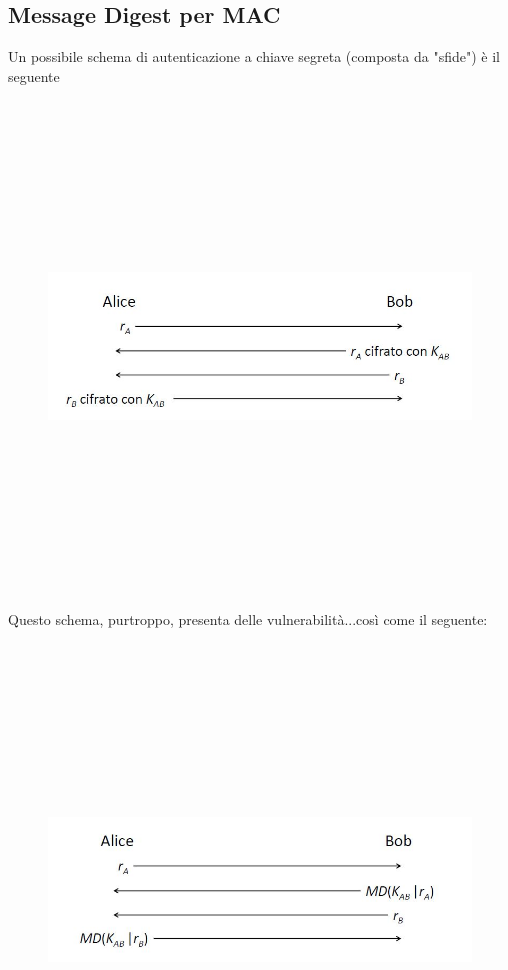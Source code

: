 \subsection{Message Digest per MAC}
Un possibile schema di autenticazione a chiave segreta (composta da "sfide") è il seguente
\begin{figure}
	\begin{center}
	{\includegraphics[height=13cm, width=13cm, keepaspectratio]{Immagini/Capitolo4/schema_autenticazione.JPG}}
	\end{center}
\end{figure}
Questo schema, purtroppo, presenta delle vulnerabilità...così come il seguente:
\begin{figure}
	\begin{center}
	{\includegraphics[height=13cm, width=13cm, keepaspectratio]{Immagini/Capitolo4/schema_autenticazione_md.JPG}}
	\end{center}
\end{figure}
